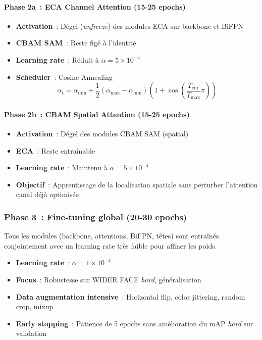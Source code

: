 \begin{onehalfspace}
\paragraph{Phase 2a~: ECA Channel Attention (15-25 epochs)}

\begin{itemize}
\item \textbf{Activation}~: Dégel (\textit{unfreeze}) des modules ECA sur backbone et BiFPN
\item \textbf{CBAM SAM}~: Reste figé à l'identité
\item \textbf{Learning rate}~: Réduit à $\alpha = 5 \times 10^{-4}$
\item \textbf{Scheduler}~: Cosine Annealing \cite{Loshchilov2017SGDR}
   \[
   \alpha_t = \alpha_{\min} + \frac{1}{2}(\alpha_{\max} - \alpha_{\min})\left(1 + \cos\left(\frac{T_{\text{cur}}}{T_{\max}}\pi\right)\right)
   \]
\end{itemize}

\paragraph{Phase 2b~: CBAM Spatial Attention (15-25 epochs)}

\begin{itemize}
\item \textbf{Activation}~: Dégel des modules CBAM SAM (spatial)
\item \textbf{ECA}~: Reste entraînable
\item \textbf{Learning rate}~: Maintenu à $\alpha = 5 \times 10^{-4}$
\item \textbf{Objectif}~: Apprentissage de la localisation spatiale sans perturber l'attention canal déjà optimisée
\end{itemize}

\subsubsection{Phase 3~: Fine-tuning global (20-30 epochs)}

\hspace{0.65 cm}Tous les modules (backbone, attentions, BiFPN, têtes) sont entraînés conjointement avec un learning rate très faible pour affiner les poids.

\begin{itemize}
\item \textbf{Learning rate}~: $\alpha = 1 \times 10^{-4}$
\item \textbf{Focus}~: Robustesse sur WIDER FACE \textit{hard}, généralisation
\item \textbf{Data augmentation intensive}~: Horizontal flip, color jittering, random crop, mixup \cite{Zhang2018Mixup}
\item \textbf{Early stopping}~: Patience de 5 epochs sans amélioration du mAP \textit{hard} sur validation
\end{itemize}


\end{onehalfspace}
